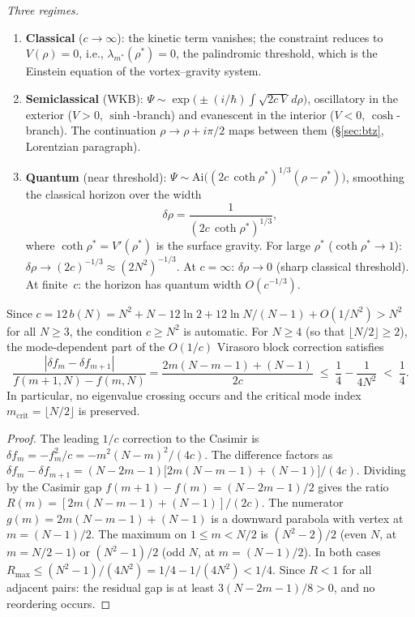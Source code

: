 \noindent
\emph{Three regimes.}
\begin{enumerate}
\item \textbf{Classical} ($c \to \infty$):
  the kinetic term vanishes; the constraint reduces to $V(\rho) = 0$,
  i.e., $\lambda_{m^*}(\rho^*) = 0$, the palindromic threshold,
  which is the Einstein equation of the vortex--gravity system.
\item \textbf{Semiclassical} (WKB):
  $\Psi \sim \exp\!\bigl(\pm(i/\hbar)\!\int\!\sqrt{2c\,V}\,d\rho\bigr)$,
  oscillatory in the exterior ($V > 0$, $\sinh$-branch) and evanescent
  in the interior ($V < 0$, $\cosh$-branch).
  The continuation $\rho \to \rho + i\pi/2$ maps between them
  (\S\ref{sec:btz}, Lorentzian paragraph).
\item \textbf{Quantum} (near threshold):
  $\Psi \sim \mathrm{Ai}\bigl((2c\,\coth\rho^*)^{1/3}
  (\rho - \rho^*)\bigr)$,
  smoothing the classical horizon over the width
\begin{equation}\label{eq:airy-width}
  \delta\rho = \frac{1}{(2c\,\coth\rho^*)^{1/3}},
\end{equation}
  where $\coth\rho^* = V'(\rho^*)$ is the surface gravity.
  For large $\rho^*$ ($\coth\rho^* \to 1$):
  $\delta\rho \to (2c)^{-1/3} \approx (2N^2)^{-1/3}$.
  At $c = \infty$: $\delta\rho \to 0$ (sharp classical threshold).
  At finite~$c$: the horizon has quantum width $O(c^{-1/3})$.
\end{enumerate}

\begin{proposition}
\label{prop:non-crossing}
Since $c = 12\,b(N) = N^2 + N - 12\ln 2 + 12\ln N/(N{-}1) + O(1/N^2) > N^2$
for all $N \ge 3$, the condition $c \ge N^2$ is automatic.
For $N \ge 4$ (so that $\lfloor N/2 \rfloor \ge 2$),
the mode-dependent part of the
$O(1/c)$ Virasoro block correction satisfies
\begin{equation}\label{eq:non-crossing}
  \frac{|\delta f_m - \delta f_{m+1}|}{f(m{+}1,N) - f(m,N)}
  = \frac{2m(N{-}m{-}1) + (N{-}1)}{2c}
  \;\le\; \frac{1}{4} - \frac{1}{4N^2}
  \;<\; \frac{1}{4}.
\end{equation}
In particular, no eigenvalue crossing occurs and the critical mode
index $m_{\mathrm{crit}} = \lfloor N/2\rfloor$ is preserved.
\end{proposition}

\begin{proof}
The leading $1/c$ correction to the Casimir is
$\delta f_m = -f_m^2/c = -m^2(N{-}m)^2/(4c)$.
The difference factors as
$\delta f_m - \delta f_{m+1}
= (N{-}2m{-}1)\bigl[2m(N{-}m{-}1)+(N{-}1)\bigr]/(4c)$.
Dividing by the Casimir gap $f(m{+}1)-f(m) = (N{-}2m{-}1)/2$
gives the ratio $R(m) = [2m(N{-}m{-}1)+(N{-}1)]/(2c)$.
The numerator $g(m) = 2m(N{-}m{-}1)+(N{-}1)$ is a downward
parabola with vertex at $m = (N{-}1)/2$.  The maximum on
$1 \le m < N/2$ is $(N^2{-}2)/2$ (even $N$, at $m = N/2{-}1$)
or $(N^2{-}1)/2$ (odd $N$, at $m = (N{-}1)/2$).
In both cases $R_{\max} \le (N^2{-}1)/(4N^2) = 1/4 - 1/(4N^2) < 1/4$.
Since $R < 1$ for all adjacent pairs: the residual gap is at least
$3(N{-}2m{-}1)/8 > 0$, and no reordering occurs.
\end{proof}

